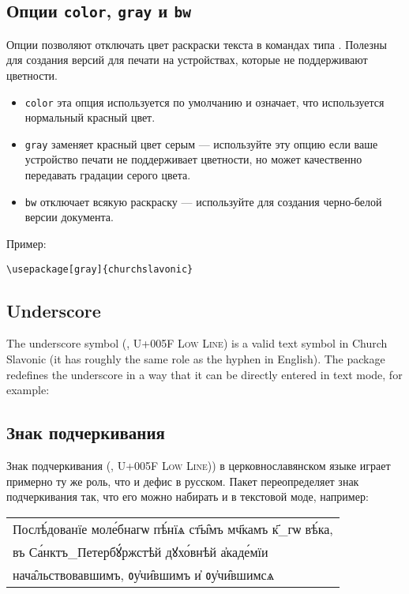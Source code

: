 \begin{RU}
\subsection{Опции \texttt{color}, \texttt{gray} и \texttt{bw}}
Опции позволяют отключать цвет раскраски текста в командах типа .
Полезны для создания версий для печати на
устройствах, которые не поддерживают цветности.

\begin{itemize}
\item \texttt{color} эта опция используется по умолчанию и означает,
что используется нормальный красный цвет.
\item \texttt{gray} заменяет красный цвет серым --- используйте эту опцию если
ваше устройство печати не поддерживает цветности, но может качественно передавать градации серого цвета.
\item \texttt{bw} отключает всякую раскраску --- используйте для создания черно-белой версии документа.
\end{itemize}
Пример:
\end{RU}

\begin{verbatim}
\usepackage[gray]{churchslavonic}
\end{verbatim}

\begin{EN}
\subsection{Underscore}
The underscore symbol (\texttt{\textunderscore}, U+005F \textsc{Low Line})
 is a valid text symbol in Church Slavonic (it has roughly the same role
as the hyphen in English). The package  redefines the
underscore in a way that it can be directly entered in text mode, for example:
\end{EN}
%
\begin{RU}
\subsection{Знак подчеркивания}
Знак подчеркивания (\texttt{\textunderscore}, U+005F \textsc{Low Line}))
в церковнославянском языке играет примерно ту же роль, что и дефис в русском.
Пакет  переопределяет знак подчеркивания так, что его можно
набирать и в текстовой моде, например:
\end{RU}
%
\begin{center}
\begin{churchslavonic}
\begin{tabular}{l}
Послѣ́дованїе моле́бнагѡ пѣ́нїѧ ст҃ы̑мъ мч҃камъ к҃_гѡ вѣ́ка, \\
въ Са́нктъ_Петербꙋ́ржстѣй дꙋхо́внѣй а҆каде́мїи \\
нача̑льствовавшимъ, ᲂу҆чи̑вшимъ и҆ ᲂу҆чи̑вшимсѧ \\
\end{tabular}
\end{churchslavonic}
\end{center}

